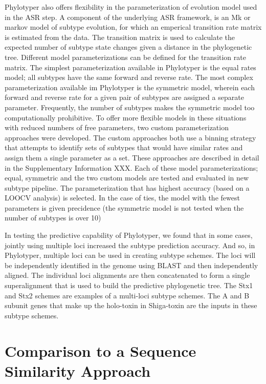 \documentclass{bioinfo}
\begin{document}
Phylotyper also offers flexibility in the parameterization of evolution model used in the ASR step.
A component of the underlying ASR framework, is an Mk or markov model of subtype evolution, for which an emperical transition rate matrix is estimated from the data.
The transition matrix is used to calculate the expected number of subtype state changes given a distance in the phylogenetic tree.  
Different model parameterizations can be defined for the transition rate matrix. 
The simplest parameterization available in Phylotyper is the equal rates model; all subtypes have the same forward and reverse rate.  
The most complex parameterization available im Phylotyper is the symmetric model, wherein each forward and reverse rate for a given pair of subtypes are assigned a separate parameter.
Frequently, the number of subtypes makes the symmetric model too computationally prohibitive.
To offer more flexible models in these situations with reduced numbers of free parameters, two custom parameterization approaches were developed.
The custom approaches both use a binning strategy that attempts to identify sets of subtypes that would have similar rates and assign them a single parameter as a set.
These approaches are described in detail in the Supplementary Information XXX.
Each of these model parameterizations; equal, symmetric and the two custom models are tested and evaluated in new subtype pipeline.
The parameterization that has highest accuracy (based on a LOOCV analysis) is selected.
In the case of ties, the model with the fewest parameters is given precidence (the symmetric model is not tested when the number of subtypes is over 10)

In testing the predictive capability of Phylotyper, we found that in some cases, jointly using multiple loci increased the subtype prediction accuracy.  
And so, in Phylotyper, multiple loci can be used in creating subtype schemes.
The loci will be independently identified in the genome using BLAST and then independently aligned.  
The individual loci alignments are then concatenated to form a single superalignment that is used to build the predictive phylogenetic tree.  
The Stx1 and Stx2 schemes are examples of a multi-loci subtype schemes.  
The A and B subunit genes that make up the holo-toxin in Shiga-toxin are the inputs in these subtype schemes.


\section{Comparison to a Sequence Similarity Approach}
\end{document}
